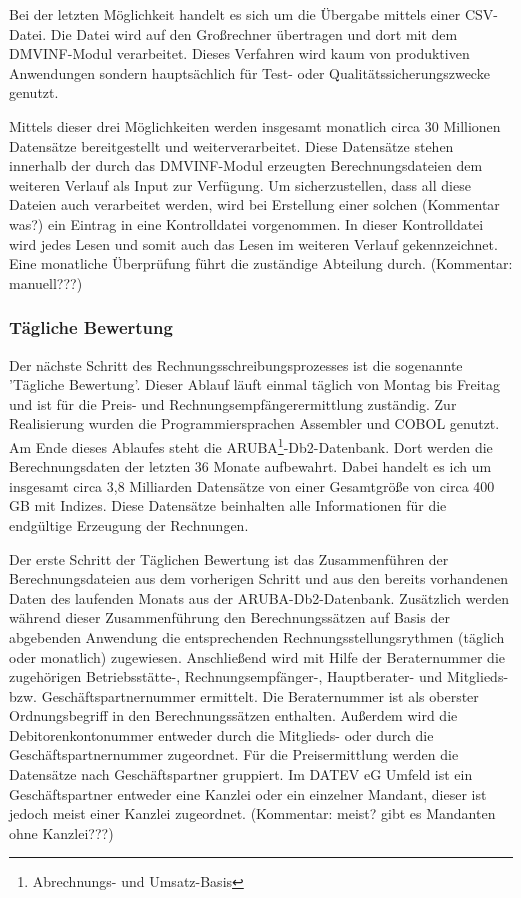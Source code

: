 Bei der letzten Möglichkeit handelt es sich um die Übergabe mittels einer CSV-Datei.
Die Datei wird auf den Großrechner übertragen und dort mit dem DMVINF-Modul verarbeitet.
Dieses Verfahren wird kaum von produktiven Anwendungen sondern hauptsächlich für Test- oder Qualitätssicherungszwecke genutzt.

Mittels dieser drei Möglichkeiten werden insgesamt monatlich circa 30 Millionen Datensätze bereitgestellt und weiterverarbeitet.
Diese Datensätze stehen innerhalb der durch das DMVINF-Modul erzeugten Berechnungsdateien dem weiteren Verlauf als Input zur Verfügung.
Um sicherzustellen, dass all diese Dateien auch verarbeitet werden, wird bei Erstellung einer solchen (Kommentar was?) ein Eintrag in eine Kontrolldatei vorgenommen.
In dieser Kontrolldatei wird jedes Lesen und somit auch das Lesen im weiteren Verlauf gekennzeichnet.
Eine monatliche Überprüfung führt die zuständige Abteilung durch. (Kommentar: manuell???)

\subsubsection{Tägliche Bewertung}
Der nächste Schritt des Rechnungsschreibungsprozesses ist die sogenannte 'Tägliche Bewertung'.
Dieser Ablauf läuft einmal täglich von Montag bis Freitag und ist für die Preis- und Rechnungsempfängerermittlung zuständig.
Zur Realisierung wurden die Programmiersprachen Assembler und COBOL genutzt.
Am Ende dieses Ablaufes steht die ARUBA\footnote{Abrechnungs- und Umsatz-Basis}-Db2-Datenbank.
Dort werden die Berechnungsdaten der letzten 36 Monate aufbewahrt.
Dabei handelt es ich um insgesamt circa 3,8 Milliarden Datensätze von einer Gesamtgröße von circa 400 GB mit Indizes.
Diese Datensätze beinhalten alle Informationen für die endgültige Erzeugung der Rechnungen.

Der erste Schritt der Täglichen Bewertung ist das Zusammenführen der Berechnungsdateien aus dem vorherigen Schritt und aus den bereits vorhandenen Daten des laufenden Monats aus der ARUBA-Db2-Datenbank.
Zusätzlich werden während dieser Zusammenführung den Berechnungssätzen auf Basis der abgebenden Anwendung die entsprechenden Rechnungsstellungsrythmen (täglich oder monatlich) zugewiesen.
Anschließend wird mit Hilfe der Beraternummer die zugehörigen Betriebsstätte-, Rechnungsempfänger-, Hauptberater- und Mitglieds- bzw. Geschäftspartnernummer ermittelt.
Die Beraternummer ist als oberster Ordnungsbegriff in den Berechnungssätzen enthalten.
Außerdem wird die Debitorenkontonummer entweder durch die Mitglieds- oder durch die Geschäftspartnernummer zugeordnet.
Für die Preisermittlung werden die Datensätze nach Geschäftspartner gruppiert.
Im DATEV eG Umfeld ist ein Geschäftspartner entweder eine Kanzlei oder ein einzelner Mandant, dieser ist jedoch meist einer Kanzlei zugeordnet. (Kommentar: meist? gibt es Mandanten ohne Kanzlei???)

